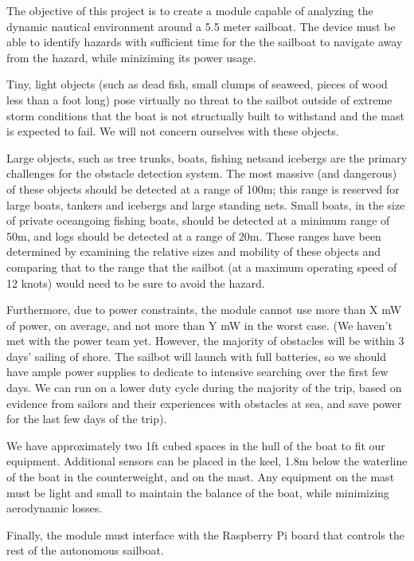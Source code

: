 The objective of this project is to create a module capable of analyzing the dynamic nautical environment around a 5.5 meter sailboat. The device must be able to identify hazards with sufficient time for the the sailboat to navigate away from the hazard, while miniziming its power usage.

Tiny, light objects (such as dead fish, small clumps of seaweed, pieces of wood less than a foot long) pose virtually no threat to the sailbot outside of extreme storm conditions that the boat is not structually built to withstand and the mast is expected to fail. We will not concern ourselves with these objects. 

Large objects, such as tree trunks, boats, fishing netsand icebergs are the primary challenges for the obstacle detection system. The most massive (and dangerous) of these objects should be detected at a range of 100m; this range is reserved for large boats, tankers and icebergs and large standing nets. Small boats, in the size of private oceangoing fishing boats, should be detected at a minimum range of 50m, and logs should be detected at a range of 20m. These ranges have been determined by examining the relative sizes and mobility of these objects and comparing that to the range that the sailbot (at a maximum operating speed of 12 knots) would need to be sure to avoid the hazard.

Furthermore, due to power constraints, the module cannot use more than X mW of power, on average, and not more than Y mW in the worst case. (We haven't met with the power team yet. However, the majority of obstacles will be within 3 days' sailing of shore. The sailbot will launch with full batteries, so we should have ample power supplies to dedicate to intensive searching over the first few days. We can run on a lower duty cycle during the majority of the trip, based on evidence from sailors and their experiences with obstacles at sea, and save power for the last few days of the trip).

We have approximately two 1ft cubed spaces in the hull of the boat to fit our equipment. Additional sensors can be placed in the keel, 1.8m below the waterline of the boat in the counterweight, and on the mast. Any equipment on the mast must be light and small to maintain the balance of the boat, while minimizing aerodynamic losses.

Finally, the module must interface with the Raspberry Pi board that controls the rest of the autonomous sailboat.